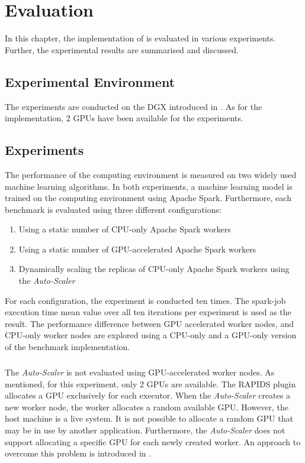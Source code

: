\chapter{Evaluation}
\label{chap:07_evaluation}

In this chapter, the implementation of  is evaluated in various experiments. Further, the experimental results are summarised and discussed.

\section{Experimental Environment}
%
The experiments are conducted on the DGX introduced in .
As for the implementation, 2 GPUs have been available for the experiments.


\section{Experiments}
The performance of the computing environment is measured on two widely used machine learning algorithms.
In both experiments, a machine learning model is trained on the computing environment using Apache Spark. Furthermore, each benchmark is evaluated using three different configurations:
\begin{enumerate}
\item Using a static number of CPU-only Apache Spark workers
\item Using a static number of GPU-accelerated Apache Spark workers
\item Dynamically scaling the replicas of CPU-only Apache Spark workers using the \textit{Auto-Scaler}
\end{enumerate}
For each configuration, the experiment is conducted ten times. The spark-job execution time mean value over all ten iterations per experiment is used as the result.
The performance difference between GPU accelerated worker nodes, and CPU-only worker nodes are explored using a CPU-only and a GPU-only version of the benchmark implementation.

\paragraph{}
The \textit{Auto-Scaler} is not evaluated using GPU-accelerated worker nodes. As mentioned, for this experiment, only 2 GPUs are available. The RAPIDS plugin allocates a GPU exclusively for each executor. When the \textit{Auto-Scaler} creates a new worker node, the worker allocates a random available GPU.
However, the host machine is a live system. It is not possible to allocate a random GPU that may be in use by another application. Furthermore, the \textit{Auto-Scaler} does not support allocating a specific GPU for each newly created worker. An approach to overcome this problem is introduced in .


